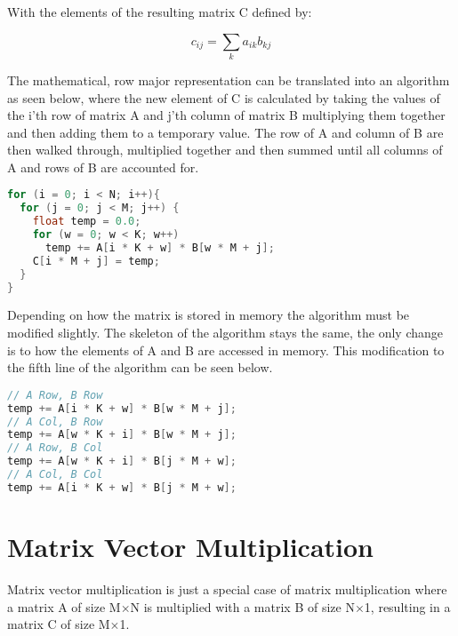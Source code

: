 \documentclass[a4paper]{article}
\begin{document}
With the elements of the resulting matrix C defined by:

\begin{equation*}
c_{ij} = \sum_{k} a_{ik}b_{kj}
\end{equation*}

The mathematical, row major representation can be translated into an algorithm as seen below, where the new element of C is calculated by taking the values of the i'th row of matrix A and j'th column of matrix B multiplying them together and then adding them to a temporary value. The row of A and column of B are then walked through, multiplied together and then summed until all columns of A and rows of B are accounted for.

\begin{lstlisting}[language=C++]
for (i = 0; i < N; i++){
  for (j = 0; j < M; j++) {
    float temp = 0.0;
    for (w = 0; w < K; w++)
      temp += A[i * K + w] * B[w * M + j];
    C[i * M + j] = temp;
  }
}
\end{lstlisting}


Depending on how the matrix is stored in memory the algorithm must be modified slightly. The skeleton of the algorithm stays the same, the only change is to how the elements of A and B are accessed in memory. This modification to the fifth line of the algorithm can be seen below.

\begin{lstlisting}[language=C++]
// A Row, B Row
temp += A[i * K + w] * B[w * M + j];
// A Col, B Row      
temp += A[w * K + i] * B[w * M + j];
// A Row, B Col         
temp += A[w * K + i] * B[j * M + w];
// A Col, B Col       
temp += A[i * K + w] * B[j * M + w];
\end{lstlisting}

\section{Matrix Vector Multiplication}
Matrix vector multiplication is just a special case of matrix multiplication where a matrix A of size M$\times$N is multiplied with a matrix B of size N$\times$1, resulting in a matrix C of size M$\times$1.
\end{document}
